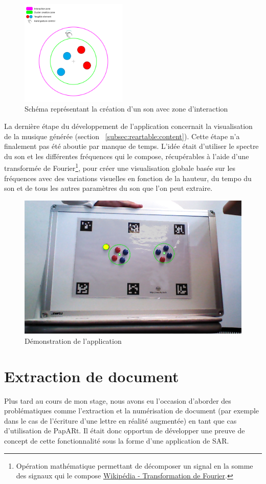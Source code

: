 \begin{figure}[H]
\centering
\includegraphics[width=0.45\textwidth]{images/reartable_cluster_interaction}
\caption{Schéma représentant la création d'un son avec zone d'interaction}
\label{fig:reartable:interactionzone}
\end{figure}

La dernière étape du développement de l'application concernait la visualisation de la musique générée (section ~\ref{subsec:reartable:content}). Cette étape n'a finalement pas été aboutie par manque de temps. L'idée était d'utiliser le spectre du son et les différentes fréquences qui le compose, récupérables à l'aide d'une transformée de Fourier\footnote{Opération mathématique permettant de décomposer un signal en la somme des signaux qui le compose \href{https://fr.wikipedia.org/wiki/Transformation_de_Fourier}{Wikipédia - Transformation de Fourier}.}, pour créer une visualisation globale basée sur les fréquences avec des variations visuelles en fonction de la hauteur, du tempo du son et de tous les autres paramètres du son que l'on peut extraire.

\begin{figure}[H]
\centering
\includegraphics[width=0.65\linewidth]{images/reartable}
\caption{Démonstration de l'application}
\label{fig:reartable:demo}
\end{figure}

\newpage
\section{Extraction de document}
\label{sec:document}
Plus tard au cours de mon stage, nous avons eu l'occasion d'aborder des problématiques comme l'extraction et la numérisation de document (par exemple dans le cas de l'écriture d'une lettre en réalité augmentée) en tant que cas d'utilisation de PapARt. Il était donc opportun de développer une preuve de concept de cette fonctionnalité sous la forme d'une application de SAR.

